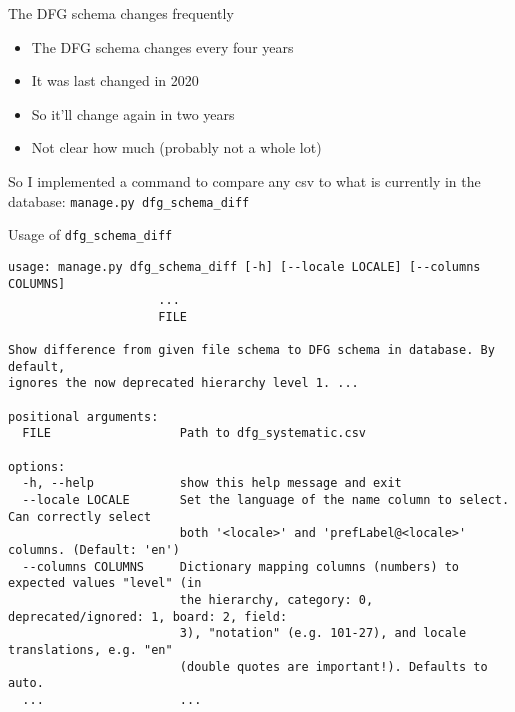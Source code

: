 \begin{frame}[c]{The DFG schema changes frequently}
    \large
    \begin{itemize}[<+(1)->]
        \item The DFG schema changes every four years
        \item It was last changed in 2020
        \item So it'll change again in two years
        \item Not clear how much (probably not a whole lot)
    \end{itemize}
    \pause
    So I implemented a command to compare any csv to what is currently in the
    database: \texttt{manage.py dfg_schema_diff}
\end{frame}


\begin{frame}[fragile]{Usage of \texttt{dfg\_schema\_diff}}
    \scriptsize
\begin{verbatim}
usage: manage.py dfg_schema_diff [-h] [--locale LOCALE] [--columns COLUMNS]
                     ...
                     FILE

Show difference from given file schema to DFG schema in database. By default,
ignores the now deprecated hierarchy level 1. ...

positional arguments:
  FILE                  Path to dfg_systematic.csv

options:
  -h, --help            show this help message and exit
  --locale LOCALE       Set the language of the name column to select. Can correctly select
                        both '<locale>' and 'prefLabel@<locale>' columns. (Default: 'en')
  --columns COLUMNS     Dictionary mapping columns (numbers) to expected values "level" (in
                        the hierarchy, category: 0, deprecated/ignored: 1, board: 2, field:
                        3), "notation" (e.g. 101-27), and locale translations, e.g. "en"
                        (double quotes are important!). Defaults to auto.
  ...                   ...
\end{verbatim}
\end{frame}

% 

